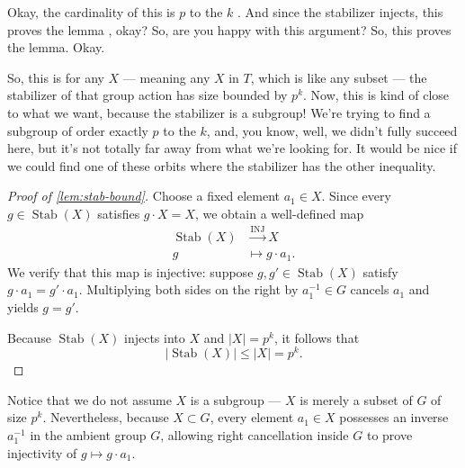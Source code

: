 \begin{proofWrapper}
\begin{speech}[00:10:04 - 00:11:48]
Okay, the cardinality of this is $p$ to the $k$ . And since the stabilizer injects, this proves the lemma , okay? So, are you happy with this argument? So, this proves the lemma. Okay.

So, this is for any $X$ --- meaning any $X$ in $T$, which is like any subset --- the stabilizer of that group action has size bounded by $p^k$. Now, this is kind of close to what we want, because the stabilizer is a subgroup! We're trying to find a subgroup of order exactly $p$ to the $k$, and, you know, well, we didn't fully succeed here, but it's not totally far away from what we're looking for. It would be nice if we could find one of these orbits where the stabilizer has the other inequality.
\end{speech}

\begin{content}
\begin{proof}[Proof of \cref{lem:stab-bound}]
Choose a fixed element $a_1 \in X$. Since every $g \in \operatorname{Stab}(X)$ satisfies $g \cdot X = X$, we obtain a well-defined map
\begin{align*}
\operatorname{Stab}(X) &\xrightarrow{\text{INJ}} X \\
g &\mapsto g \cdot a_1.
\end{align*}
We verify that this map is injective: suppose $g, g' \in \operatorname{Stab}(X)$ satisfy $g \cdot a_1 = g' \cdot a_1$. Multiplying both sides on the right by $a_1^{-1} \in G$ cancels $a_1$ and yields $g = g'$.

Because $\operatorname{Stab}(X)$ injects into $X$ and $|X| = p^k$, it follows that
\[
|\operatorname{Stab}(X)| \le |X| = p^k.
\]
\end{proof}

\begin{steps}
Notice that we do not assume $X$ is a subgroup --- $X$ is merely a subset of $G$ of size $p^k$. Nevertheless, because $X \subset G$, every element $a_1 \in X$ possesses an inverse $a_1^{-1}$ in the ambient group $G$, allowing right cancellation inside $G$ to prove injectivity of $g \mapsto g \cdot a_1$.
\end{steps}
\end{content}

\begin{hidden}
\end{hidden}


\end{proofWrapper}

